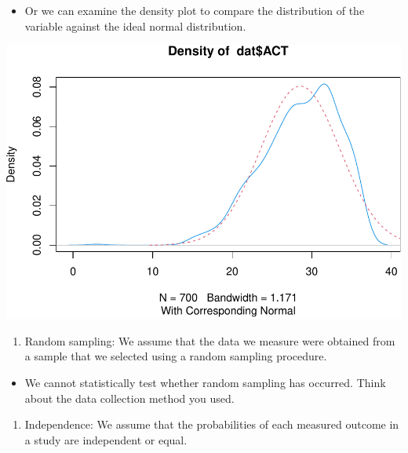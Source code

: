 \documentclass[
]{book}
\newenvironment{Shaded}{\begin{snugshade}}{\end{snugshade}}
\newcommand{\CommentTok}[1]{\textcolor[rgb]{0.56,0.35,0.01}{\textit{#1}}}
\newcommand{\FunctionTok}[1]{\textcolor[rgb]{0.13,0.29,0.53}{\textbf{#1}}}
\newcommand{\NormalTok}[1]{#1}
\newcommand{\SpecialCharTok}[1]{\textcolor[rgb]{0.81,0.36,0.00}{\textbf{#1}}}
\providecommand{\tightlist}{%
  \setlength{\itemsep}{0pt}\setlength{\parskip}{0pt}}
\begin{document}
\begin{itemize}
\tightlist
\item
  Or we can examine the density plot to compare the distribution of the variable against the ideal normal distribution.
\end{itemize}

\begin{Shaded}
\end{Shaded}

\includegraphics{PSY202A-Modeling-I.Heo_files/figure-latex/unnamed-chunk-92-1.pdf}

\begin{enumerate}
\def\labelenumi{\arabic{enumi}.}
\setcounter{enumi}{1}
\tightlist
\item
  Random sampling: We assume that the data we measure were obtained from a sample that we selected using a random sampling procedure.
\end{enumerate}

\begin{itemize}
\tightlist
\item
  We cannot statistically test whether random sampling has occurred. Think about the data collection method you used.
\end{itemize}

\begin{enumerate}
\def\labelenumi{\arabic{enumi}.}
\setcounter{enumi}{2}
\tightlist
\item
  Independence: We assume that the probabilities of each measured outcome in a study are independent or equal.
\end{enumerate}
\end{document}
